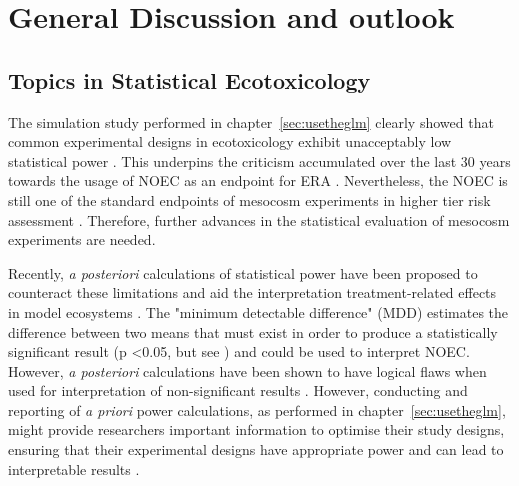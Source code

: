 
\chapter{General Discussion and outlook}
\label{sec:discussion} 
 
\section{Topics in Statistical Ecotoxicology}
The simulation study performed in chapter~\ref{sec:usetheglm} clearly showed that common experimental designs in ecotoxicology exhibit unacceptably low statistical power \citep{szocs_statistical_2016, van_der_hoeven_power_1998}.
This underpins the criticism accumulated over the last 30 years towards the usage of NOEC as an endpoint for ERA \citep{fox_comment_2016}. 
Nevertheless, the NOEC is still one of the standard endpoints of mesocosm experiments in higher tier risk assessment \citep{efsa_guidance_2013}.
Therefore, further advances in the statistical evaluation of mesocosm experiments are needed.

Recently, \emph{a posteriori} calculations of statistical power have been proposed to counteract these limitations and aid the interpretation treatment-related effects in model ecosystems \citep{brock_minimum_2015}.
The "minimum detectable difference" (MDD) estimates the difference between two means that must exist in order to produce a statistically significant result (p \textless 0.05, but see \citet{gelman_difference_2006}) and could be used to interpret NOEC.
However, \emph{a posteriori} calculations have been shown to have logical flaws when used for interpretation of non-significant results \citep{hoenig_abuse_2001, nakagawa_case_2004}. 
However, conducting and reporting of \emph{a priori} power calculations, as performed in chapter~\ref{sec:usetheglm}, might provide researchers important information to optimise their study designs, ensuring that their experimental designs have appropriate power and can lead to interpretable results \citep{johnson_power_2015}.

